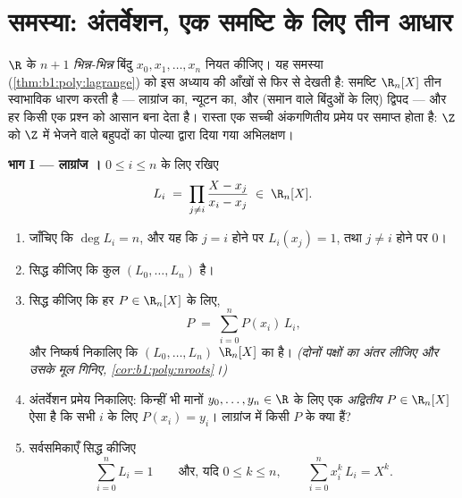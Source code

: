 \section{समस्या: अंतर्वेशन, एक समष्टि के लिए तीन आधार}

\begin{problem}\label{pb:b1:vspaces:1}
$\R$ के $n + 1$ \emph{भिन्न-भिन्न} बिंदु $x_0, x_1, \dots, x_n$ नियत कीजिए।
यह समस्या  (\cref{thm:b1:poly:lagrange}) को इस अध्याय की
आँखों से फिर से देखती है: समष्टि $\R_n[X]$ तीन स्वाभाविक  धारण करती है
--- लाग्रांज का, न्यूटन का, और (समान  वाले बिंदुओं के लिए) द्विपद 
--- और हर  किसी एक प्रश्न को आसान बना देता है। रास्ता एक सच्ची अंकगणितीय
प्रमेय पर समाप्त होता है: $\Z$ को $\Z$ में भेजने वाले बहुपदों का पोल्या
द्वारा दिया गया अभिलक्षण। 

\medskip \noindent\textbf{भाग I --- लाग्रांज ।} $0 \leq i \leq n$ के लिए
रखिए
\[
L_i \;=\; \prod_{j \neq i} \frac{X - x_j}{x_i - x_j} \;\in\;
\R_n[X].
\]
\begin{enumerate}
  \item जाँचिए कि $\deg L_i = n$, और यह कि $j = i$ होने पर $L_i(x_j) = 1$,
  तथा $j \neq i$ होने पर $0$।
  \item सिद्ध कीजिए कि कुल $(L_0, \dots, L_n)$  है।
  \item सिद्ध कीजिए कि हर $P \in \R_n[X]$ के लिए,
        \[
        P \;=\; \sum_{i=0}^{n} P(x_i)\, L_i ,
        \]
        और निष्कर्ष निकालिए कि $(L_0, \dots, L_n)$ $\R_n[X]$ का  है।
        \emph{(दोनों पक्षों का अंतर लीजिए और उसके मूल गिनिए,
        \cref{cor:b1:poly:nroots}।)}
  \item अंतर्वेशन प्रमेय निकालिए: किन्हीं भी मानों $y_0, \dots, y_n \in \R$
  के लिए एक \emph{अद्वितीय} $P \in \R_n[X]$ ऐसा है कि सभी $i$ के लिए $P(x_i)
  = y_i$। लाग्रांज  में किसी  $P$ के  क्या हैं?
  \item सर्वसमिकाएँ सिद्ध कीजिए
        \[
        \sum_{i=0}^{n} L_i = 1
        \qquad\text{और, यदि } 0 \leq k \leq n,\qquad
        \sum_{i=0}^{n} x_i^{k}\, L_i = X^{k} .
        \]
\end{enumerate}


\end{problem}
